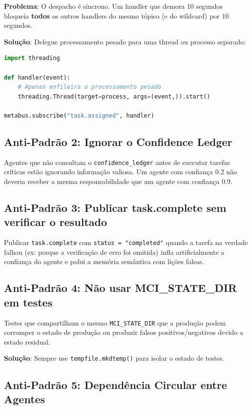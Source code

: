 \textbf{Problema}: O despacho é síncrono. Um handler que demora 10 segundos bloqueia \textbf{todos} os outros handlers do mesmo tópico (e do wildcard) por 10 segundos.

\textbf{Solução}: Delegue processamento pesado para uma thread ou processo separado:

\begin{lstlisting}[language=Python, caption={Handler não-bloqueante com thread}, label={lst:nonblocking-handler}]
import threading

def handler(event):
    # Apenas enfileira o processamento pesado
    threading.Thread(target=process, args=(event,)).start()

metabus.subscribe("task.assigned", handler)
\end{lstlisting}

\subsection{Anti-Padrão 2: Ignorar o Confidence Ledger}

Agentes que não consultam o \texttt{confidence\_ledger} antes de executar tarefas críticas estão ignorando informação valiosa. Um agente com confiança 0.2 não deveria receber a mesma responsabilidade que um agente com confiança 0.9.

\subsection{Anti-Padrão 3: Publicar task.complete sem verificar o resultado}

Publicar \texttt{task.complete} com \texttt{status = "completed"} quando a tarefa na verdade falhou (ex: porque a verificação de erro foi omitida) infla artificialmente a confiança do agente e polui a memória semântica com lições falsas.

\subsection{Anti-Padrão 4: Não usar MCI\_STATE\_DIR em testes}

Testes que compartilham o mesmo \texttt{MCI\_STATE\_DIR} que a produção podem corromper o estado de produção ou produzir falsos positivos/negativos devido a estado residual.

\textbf{Solução}: Sempre use \texttt{tempfile.mkdtemp()} para isolar o estado de testes.

\subsection{Anti-Padrão 5: Dependência Circular entre Agentes}

